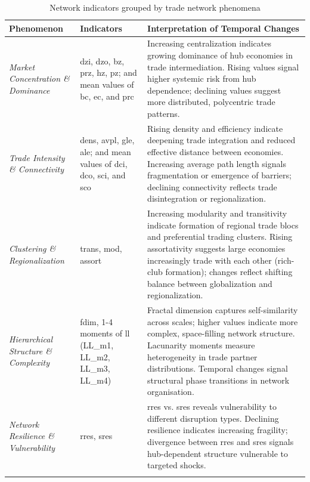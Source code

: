 \documentclass[preprint, 3p,
authoryear]{elsarticle} %
\begin{document}
\begin{table}[H]
\centering
\caption{Network indicators grouped by trade network phenomena}
\label{tab:indicator_groups}
\scriptsize
\begin{tabular}{@{}p{2.8cm}p{4.5cm}p{7cm}@{}}
\toprule
\textbf{Phenomenon} & \textbf{Indicators} & \textbf{Interpretation of Temporal Changes} \\
\midrule

\textit{Market Concentration \& Dominance} & 
\gls{dzi}, \gls{dzo}, \gls{bz}, \gls{prz}, \gls{hz}, \gls{pz}; and mean values of \gls{bc}, \gls{ec}, and \gls{prc} & 
Increasing centralization indicates growing dominance of hub economies in trade intermediation. Rising values signal higher systemic risk from hub dependence; declining values suggest more distributed, polycentric trade patterns. \\
\addlinespace

\textit{Trade Intensity \& Connectivity} & 
\gls{dens}, \gls{avpl}, \gls{gle}, \gls{ale}; and mean values of \gls{dci}, \gls{dco}, \gls{sci}, and \gls{sco} & 
Rising density and efficiency indicate deepening trade integration and reduced effective distance between economies. Increasing average path length signals fragmentation or emergence of barriers; declining connectivity reflects trade disintegration or regionalization. \\
\addlinespace

\textit{Clustering \& Regionalization} & 
\gls{trans}, \gls{mod}, \gls{assort} & 
Increasing modularity and transitivity indicate formation of regional trade blocs and preferential trading clusters. Rising assortativity suggests large economies increasingly trade with each other (rich-club formation); changes reflect shifting balance between globalization and regionalization. \\
\addlinespace

\textit{Hierarchical Structure \& Complexity} & 
\gls{fdim}, 1-4 moments of \gls{ll} (LL\_m1, LL\_m2, LL\_m3, LL\_m4) & 
Fractal dimension captures self-similarity across scales; higher values indicate more complex, space-filling network structure. Lacunarity moments measure heterogeneity in trade partner distributions. Temporal changes signal structural phase transitions in network organisation. \\
\addlinespace

\textit{Network Resilience \& Vulnerability} & 
\acrshort{rres}, \acrshort{sres} & 
\acrlong{rres} vs. \acrlong{sres} reveals vulnerability to different disruption types. Declining resilience indicates increasing fragility; divergence between \acrshort{rres} and \acrshort{sres} signals hub-dependent structure vulnerable to targeted shocks. \\
\addlinespace


\end{tabular}
\end{table}
\end{document}
